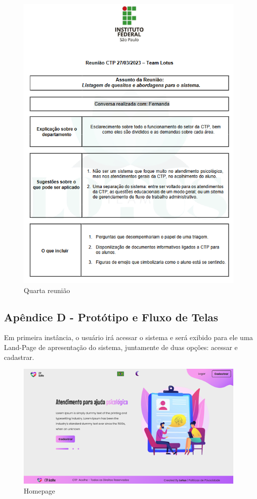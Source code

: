 \documentclass[12pt,a4paper]{article}
\begin{document}
\begin{figure}[H]
    \centering
     \includegraphics[width=15cm]{ilus4.png}
     \caption{Quarta reunião}
     \label{fig}
\end{figure}

\newpage

\subsection{Apêndice D - Protótipo e Fluxo de Telas}
Em primeira instância, o usuário irá acessar o sistema e será exibido para ele uma Land-Page de apresentação do sistema, juntamente de duas opções: acessar e cadastrar.

\begin{figure}[H]
    \centering
     \includegraphics[width=15cm]{prot.png}
     \caption{Homepage}
\end{figure}
\end{document}
